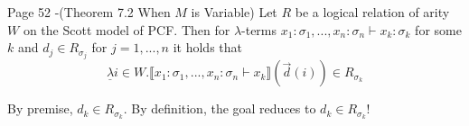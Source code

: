 \begin{problem}{Page 52}
    -(Theorem 7.2 When $M$ is Variable) Let $R$ be a logical relation of arity $W$ on the Scott model of PCF. Then for $\lambda$-terms $x_1:\sigma_1, ..., x_n:\sigma_n \vdash x_k:\sigma_k$ for some $k$ and $d_j \in R_{\sigma_j}$ for $j =1, ..., n$ it holds that 
$$ \underline{\lambda} i \in W. \llbracket x_1:\sigma_1, ..., x_n : \sigma_n \vdash x_k \rrbracket (\vec{d}(i)) \in R_{\sigma_k} $$
\end{problem}

\begin{solution}
    By premise, $d_k \in R_{\sigma_k}$. By definition, the goal reduces to $d_k \in R_{\sigma_k}$!
\end{solution}